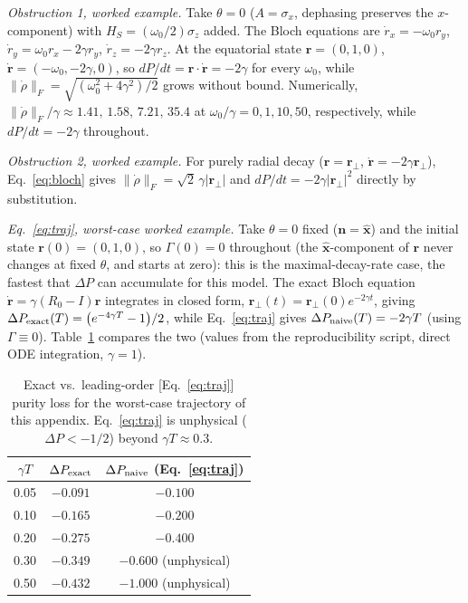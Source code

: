 \documentclass[aps,pra,reprint,superscriptaddress,nofootinbib,longbibliography]{revtex4-2}
\begin{document}
\emph{Obstruction 1, worked example.} Take $\theta=0$ ($A=\sigma_x$,
dephasing preserves the $x$-component) with
$H_S=(\omega_0/2)\sigma_z$ added. The Bloch equations are
$\dot r_x=-\omega_0 r_y$, $\dot r_y=\omega_0 r_x-2\gamma r_y$,
$\dot r_z=-2\gamma r_z$. At the equatorial state $\mathbf r=(0,1,0)$,
$\dot{\mathbf r}=(-\omega_0,-2\gamma,0)$, so
$dP/dt=\mathbf r\cdot\dot{\mathbf r}=-2\gamma$ for every $\omega_0$,
while $\|\dot\rho\|_F=\sqrt{(\omega_0^2+4\gamma^2)/2}$ grows without
bound. Numerically, $\|\dot\rho\|_F/\gamma\approx1.41,\,1.58,\,7.21,\,35.4$
at $\omega_0/\gamma=0,1,10,50$, respectively, while $dP/dt=-2\gamma$
throughout.

\emph{Obstruction 2, worked example.} For purely radial decay
($\mathbf r=\mathbf r_\perp$, $\dot{\mathbf r}=-2\gamma\mathbf r_\perp$),
Eq.~\eqref{eq:bloch} gives $\|\dot\rho\|_F=\sqrt2\,\gamma|\mathbf r_\perp|$
and $dP/dt=-2\gamma|\mathbf r_\perp|^2$ directly by substitution.

\emph{Eq.~\eqref{eq:traj}, worst-case worked example.} Take $\theta=0$
fixed ($\mathbf n=\hat{\mathbf x}$) and the initial state
$\mathbf r(0)=(0,1,0)$, so $\Gamma(0)=0$ throughout (the
$\hat{\mathbf x}$-component of $\mathbf r$ never changes at fixed
$\theta$, and starts at zero): this is the maximal-decay-rate case,
the fastest that $\Delta P$ can accumulate for this model. The exact
Bloch equation $\dot{\mathbf r}=\gamma(R_0-I)\mathbf r$ integrates in
closed form, $\mathbf r_\perp(t)=\mathbf r_\perp(0)e^{-2\gamma t}$,
giving $\Delta P_{\rm exact}(T)=\bigl(e^{-4\gamma T}-1\bigr)/2$, while
Eq.~\eqref{eq:traj} gives $\Delta P_{\rm naive}(T)=-2\gamma T$ (using
$\Gamma\equiv0$). Table~\ref{tab:traj} compares the two (values from
the reproducibility script, direct ODE integration, $\gamma=1$).

\begin{table}[htbp]
\centering
\caption{Exact vs.\ leading-order [Eq.~\eqref{eq:traj}] purity loss for
the worst-case trajectory of this appendix. Eq.~\eqref{eq:traj} is
unphysical ($\Delta P<-1/2$) beyond $\gamma T\approx0.3$.}
\label{tab:traj}
\begin{tabular}{ccc}
\hline\hline
$\gamma T$ & $\Delta P_{\rm exact}$ & $\Delta P_{\rm naive}$ (Eq.~\eqref{eq:traj}) \\
\hline
0.05 & $-0.091$ & $-0.100$ \\
0.10 & $-0.165$ & $-0.200$ \\
0.20 & $-0.275$ & $-0.400$ \\
0.30 & $-0.349$ & $-0.600$ (unphysical) \\
0.50 & $-0.432$ & $-1.000$ (unphysical) \\
\hline\hline
\end{tabular}
\end{table}
\end{document}
